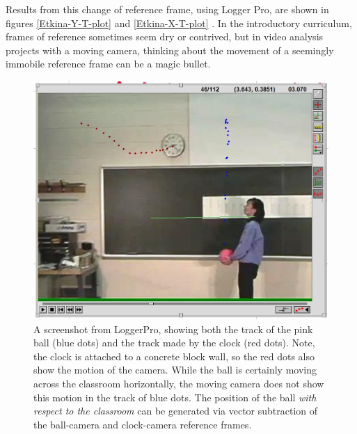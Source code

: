 \documentclass[12pt]{iopart}
\begin{document}
Results from this change of reference frame, using Logger Pro, are shown in figures \ref{Etkina-Y-T-plot} and \ref{Etkina-X-T-plot} . 
In the introductory curriculum, frames of reference sometimes seem dry or contrived, but in video analysis projects with a moving camera, thinking about the movement of a seemingly immobile reference frame can be a magic bullet.  

\begin{figure}[h]
\centering
\includegraphics[width=\columnwidth]{figure_3_Etkina-dots-2.jpg}
\caption{
A screenshot from LoggerPro, showing both the track of the pink ball (blue dots) and the track made by the clock (red dots).  Note, the clock is attached to a concrete block wall, so the red dots also show the motion of the camera.  
While the ball is certainly moving across the classroom horizontally, the moving camera does not show this motion in the track of blue dots.
The position of the ball \textit{with respect to the classroom} can be generated via vector subtraction of the ball-camera and clock-camera reference frames.
}
\label{Etkina-dots-2}
\end{figure}
\end{document}
